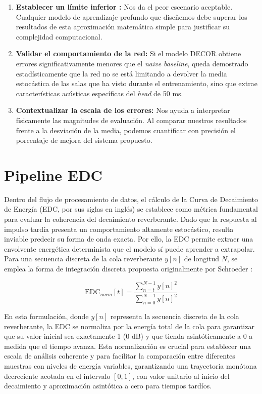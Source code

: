 \begin{enumerate}
    \item \textbf{Establecer un límite inferior :} Nos da el peor escenario aceptable. Cualquier modelo de aprendizaje profundo que diseñemos debe superar  los resultados de esta aproximación matemática simple para justificar su complejidad computacional.
    \item \textbf{Validar el comportamiento de la red:} Si el modelo DECOR obtiene errores significativamente menores que el \textit{naive baseline}, queda demostrado estadísticamente que la red no se está limitando a devolver la media estocástica de las salas que ha visto durante el entrenamiento, sino que extrae características acústicas específicas del \textit{head} de 50 ms.
    \item \textbf{Contextualizar la escala de los errores:} Nos ayuda a interpretar físicamente las magnitudes de evaluación. Al comparar nuestros resultados frente a la desviación de la media, podemos cuantificar con precisión el porcentaje de mejora del sistema propuesto.
\end{enumerate}
\section{Pipeline EDC}

Dentro del flujo de procesamiento de datos, el cálculo de la Curva de Decaimiento de Energía (EDC, por sus siglas en inglés) se establece como métrica fundamental para evaluar la coherencia del decaimiento reverberante. Dado que la respuesta al impulso tardía presenta un comportamiento altamente estocástico, resulta inviable predecir su forma de onda exacta. Por ello, la EDC permite extraer una envolvente energética determinista que el modelo sí puede aprender a extrapolar. Para una secuencia discreta de la cola reverberante $y[n]$ de longitud $N$, se emplea la forma de integración discreta propuesta originalmente por Schroeder \cite{Schroeder1965}:

\begin{equation}
\mathrm{EDC}_{norm}[t] = \frac{\sum_{n=t}^{N-1} y[n]^2}{\sum_{n=0}^{N-1} y[n]^2}
\end{equation}

En esta formulación, donde $y[n]$ representa la secuencia discreta de la cola reverberante, la EDC se normaliza por la energía total de la cola para garantizar que su valor inicial sea exactamente 1 (0 dB) y que tienda asintóticamente a 0 a medida que el tiempo avanza. Esta normalización es crucial para establecer una escala de análisis coherente y para facilitar la comparación entre diferentes muestras con niveles de energía variables, garantizando una trayectoria monótona decreciente acotada en el intervalo $[0,1]$, con valor unitario al inicio del decaimiento y aproximación asintótica a cero para tiempos tardíos.

